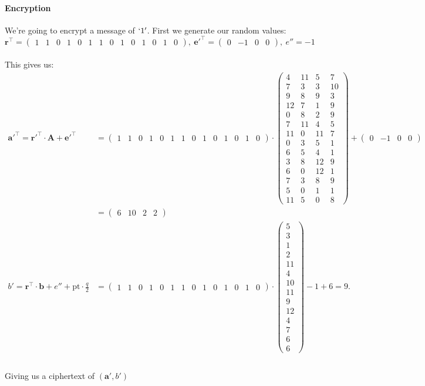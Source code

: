 \documentclass[a4paper, 11pt, openany]{book}
\begin{document}
\paragraph{Encryption}
We're going to encrypt a message of $`1'$. First we generate our random values:
$$ \textbf{r}^{\top} = \begin{pmatrix}
	1&1&0&1&0&1&1&0&1&0&1&0&1&0
\end{pmatrix},~
\textbf{e}'^{\top}=\begin{pmatrix}
	0&-1&0&0
\end{pmatrix},~
e'' = -1
$$
\\
This gives us:
\begin{align*}
\textbf{a}'^{\top} = \textbf{r}'^{\top}\cdot \textbf{A}+\textbf{e}'^{\top}  &=
\begin{pmatrix}
	1&1&0&1&0&1&1&0&1&0&1&0&1&0
\end{pmatrix} \cdot
\begin{pmatrix}
	4& 11&  5&  7\\
	7&  3&  3& 10\\
	9&  8&  9&  3\\
	12&  7&  1&  9\\
	0&  8&  2&  9\\
	7& 11&  4&  5\\
	11&  0& 11&  7\\
	0&  3&  5&  1\\
	6&  5&  4&  1\\
	3&  8& 12&  9\\
	6&  0& 12&  1\\
	7&  3&  8&  9\\
	5&  0&  1&  1\\
	11&  5&  0&  8
\end{pmatrix} + \begin{pmatrix}
0&-1&0&0
\end{pmatrix}\\
&=
\begin{pmatrix}
6&10&2&2
\end{pmatrix}\\
b'  = \textbf{r}^{\top}\cdot\textbf{b} + e'' + \text{pt}\cdot\frac{q}{2} &=  \begin{pmatrix}
	1&1&0&1&0&1&1&0&1&0&1&0&1&0
\end{pmatrix}\cdot
\begin{pmatrix}
	5\\3\\1\\2\\11\\4\\10\\11\\9\\12\\4\\7\\6\\6
\end{pmatrix} -1 + 6 = 9.
\\
\end{align*}
\\
Giving us a ciphertext of $(\textbf{a}',b')$
\end{document}
